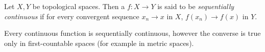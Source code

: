 \documentclass[12pt]{article}
\begin{document}
Let $X, Y$ be topological spaces. Then a $f : X \rightarrow Y$ is said to be \emph{sequentially continuous} if for every convergent sequence $x_n \rightarrow x$ in $X$, $f(x_n) \rightarrow f(x)$ in $Y$.

Every continuous function is sequentially continuous, however the converse is true only in first-countable spaces (for example in metric spaces).
\end{document}
